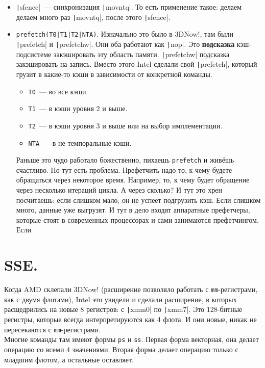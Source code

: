 \documentclass{article}
\begin{document}
\begin{itemize}
        \item \texttt|sfence|~--- синхронизация \texttt|movntq|. То есть применение такое: делаем делаем много раз \texttt|movntq|, после этого \texttt|sfence|.
        \item \Verb/prefetch(T0|T1|T2|NTA)/. Изначально это было в 3DNow!, там были \texttt|prefetch| и \texttt|prefetchw|. Они оба работают как \texttt|nop|. Это \textbf{подсказка} кэш-подсистеме закэшировать эту область памяти. \texttt|prefetchw| подсказка закэшировать на запись. Вместо этого Intel сделали свой \texttt|prefetch|, который грузит в какие-то кэши в зависимости от конкретной команды.
        \begin{itemize}
            \item \Verb|T0|~--- во все кэши.
            \item \Verb|T1|~--- в кэши уровня 2 и выше.
            \item \Verb|T2|~--- в кэши уровня 3 и выше или на выбор имплементации.
            \item \Verb|NTA|~--- в не-темпоральные кэши.
        \end{itemize}
        Раньше это чудо работало божественно, пихаешь \Verb|prefetch| и живёшь счастливо. Но тут есть проблема. Префетчить надо то, к чему будете обращаться через некоторое время. Например, то, к чему будет обращение через несколько итераций цикла. А через сколько? И тут это хрен посчитаешь: если слишком мало, он не успеет подгрузить кэш. Если слишком много, данные уже выгрузят. И тут в дело входят аппаратные префетчеры, которые стоят в современных процессорах и сами занимаются префетчингом. Если 
    \end{itemize}
    \section{SSE.}
    Когда AMD склепали 3DNow! (расширение позволяло работать с \Verb|mm|-регистрами, как с двумя флотами), Intel это увидели и сделали расширение, в которых расщедрились на новые 8 регистров: с \texttt|xmm0| по \texttt|xmm7|. Это 128-битные регистры, которые всегда интерпретируются как 4 флота. И они новые, никак не пересекаются с \Verb|mm|-регистрами.\\
    Многие команды там имеют формы \Verb|ps| и \Verb|ss|. Первая форма векторная, она делает операцию со всеми 4 значениями. Вторая форма делает операцию только с младшим флотом, а остальные оставляет.
\end{document}
